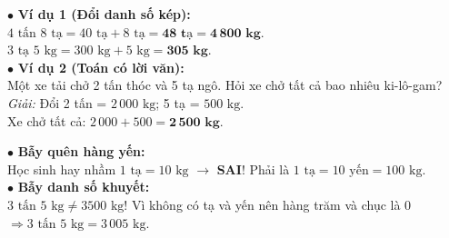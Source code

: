 \documentclass[14pt,a4paper,oneside]{extbook}
\begin{document}
\noindent
\begin{minipage}[t]{0.53\textwidth}
  \begin{tcolorbox}[
    enhanced,
    title={\footnotesize\bfseries\color{white}\faCheckCircle\ Ví dụ thực hành chuẩn mực},
    colback=green!2!white,
    colframe=green!60!black,
    arc=2.5mm, boxrule=0.8pt, top=1.8mm, bottom=1.8mm, left=2.2mm, right=2.2mm
  ]
    \footnotesize
    $\bullet$ \textbf{Ví dụ 1 (Đổi danh số kép):}\\
    $4\text{ tấn } 8\text{ tạ} = 40\text{ tạ} + 8\text{ tạ} = \mathbf{48\text{ tạ}} = \mathbf{4\,800\text{ kg}}$.\\
    $3\text{ tạ } 5\text{ kg} = 300\text{ kg} + 5\text{ kg} = \mathbf{305\text{ kg}}$.\\
    $\bullet$ \textbf{Ví dụ 2 (Toán có lời văn):}\\
    Một xe tải chở 2 tấn thóc và 5 tạ ngô. Hỏi xe chở tất cả bao nhiêu ki-lô-gam?\\
    \textit{Giải:} Đổi 2 tấn = $2\,000\text{ kg}$; 5 tạ = $500\text{ kg}$.\\
    Xe chở tất cả: $2\,000 + 500 = \mathbf{2\,500\text{ kg}}$.
  \end{tcolorbox}
\end{minipage}%
\hfill
\begin{minipage}[t]{0.45\textwidth}
  \begin{tcolorbox}[
    enhanced,
    title={\footnotesize\bfseries\color{white}\faExclamationTriangle\ Mẹo tránh bẫy trắc nghiệm},
    colback=red!2!white,
    colframe=red!70!black,
    arc=2.5mm, boxrule=0.8pt, top=1.8mm, bottom=1.8mm, left=2.2mm, right=2.2mm
  ]
    \footnotesize
    $\bullet$ \textbf{Bẫy quên hàng yến:}\\
    Học sinh hay nhầm $1\text{ tạ} = 10\text{ kg}$ $\rightarrow$ \textbf{SAI}! Phải là $1\text{ tạ} = 10\text{ yến} = 100\text{ kg}$.\\
    $\bullet$ \textbf{Bẫy danh số khuyết:}\\
    $3\text{ tấn } 5\text{ kg} \ne 3500\text{ kg}$! Vì không có tạ và yến nên hàng trăm và chục là 0 $\Rightarrow 3\text{ tấn } 5\text{ kg} = 3\,005\text{ kg}$.
  \end{tcolorbox}
\end{minipage}
\end{document}
